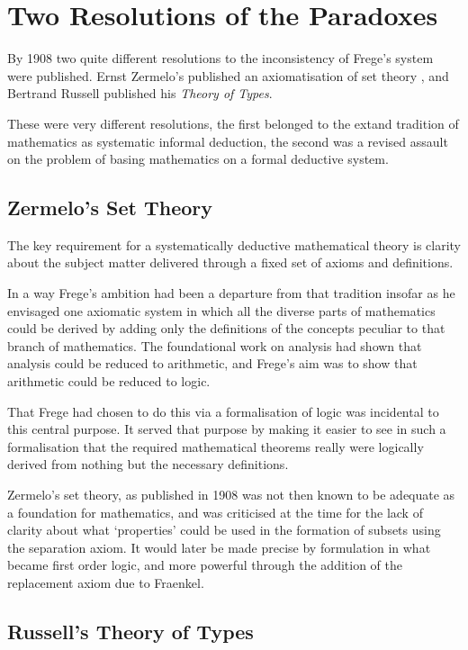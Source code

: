 \documentclass[10pt,titlepage]{book}
\begin{document}
\section{Two Resolutions of the Paradoxes}

By 1908 two quite different resolutions to the inconsistency of Frege's system were published.
Ernst Zermelo's published an axiomatisation of set theory \cite{zermelo08}, and Bertrand Russell published his \emph{Theory of Types}\cite{heijenoort67,russell1908}.

These were very different resolutions, the first belonged to the extand tradition of mathematics as systematic informal deduction, the second was a revised assault on the problem of basing mathematics on a formal deductive system.

\subsection{Zermelo's Set Theory}

The key requirement for a systematically deductive mathematical theory is clarity about the subject matter delivered through a fixed set of axioms and definitions.

In a way Frege's ambition had been a departure from that tradition insofar as he envisaged one axiomatic system in which all the diverse parts of mathematics could be derived by adding only the definitions of the concepts peculiar to that branch of mathematics.
The foundational work on analysis had shown that analysis could be reduced to arithmetic, and Frege's aim was to show that arithmetic could be reduced to logic.

That Frege had chosen to do this via a formalisation of logic was incidental to this central purpose.
It served that purpose by making it easier to see in such a formalisation that the required mathematical theorems really were logically derived from nothing but the necessary definitions.

Zermelo's set theory, as published in 1908 was not then known to be adequate as a foundation for mathematics, and was criticised at the time for the lack of clarity about what `properties' could be used in the formation of subsets using the separation axiom.
It would later be made precise by formulation in what became first order logic, and more powerful through the addition of the replacement axiom due to Fraenkel.

\subsection{Russell's Theory of Types}
\end{document}
